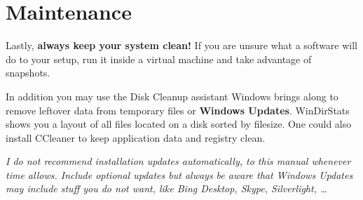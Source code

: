 \documentclass{itsarticle}
\begin{document}
\section{Maintenance}
\label{sec:maintenance}

Lastly, \textbf{always keep your system clean!} If you are unsure what a
software will do to your setup, run it inside a virtual machine and take
advantage of snapshots.

In addition you may use the Disk Cleanup assistant Windows brings along to
remove leftover data from temporary files or \textbf{Windows Updates}.
WinDirStats shows you a layout of all files located on a disk sorted by
filesize. One could also install CCleaner to keep application data and registry
clean.

\textit{I do not recommend installation updates automatically, to this manual
whenever time allows. Include optional updates but always be aware that Windows
Updates may include stuff you do not want, like Bing Desktop, Skype,
Silverlight, \ldots}
\end{document}
